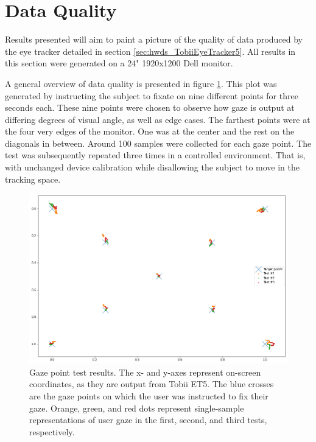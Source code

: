 \section{Data Quality} \label{sec:res_DataQuality}


Results presented will aim to paint a picture of the quality of data produced by the eye tracker detailed in section \ref{sec:hwds_TobiiEyeTracker5}. All results in this section were generated on a 24" 1920x1200 Dell monitor.

A general overview of data quality is presented in figure \ref{fig:res_GazePointTest}. This plot was generated by instructing the subject to fixate on nine different points for three seconds each. These nine points were chosen to observe how gaze is output at differing degrees of visual angle, as well as edge cases. The farthest points were at the four very edges of the monitor. One was at the center and the rest on the diagonals in between. Around 100 samples were collected for each gaze point. The test was subsequently repeated three times in a controlled environment. That is, with unchanged device calibration while disallowing the subject to move in the tracking space.

\begin{figure}[h]
    \centering
    \includegraphics[width=\textwidth]{Images/DataQuality/GazePointTest.png}
    \caption{Gaze point test results. The x- and y-axes represent on-screen coordinates, as they are output from Tobii ET5. The blue crosses are the gaze points on which the user was instructed to fix their gaze. Orange, green, and red dots represent single-sample representations of user gaze in the first, second, and third tests, respectively.}
    \label{fig:res_GazePointTest}
\end{figure}

